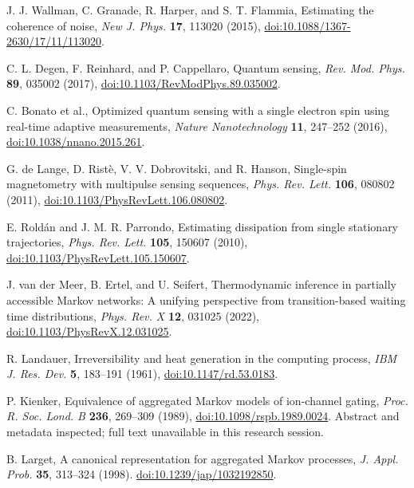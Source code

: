  J. J. Wallman, C. Granade, R. Harper, and S. T. Flammia, Estimating the coherence of noise, \emph{New J. Phys.} \textbf{17}, 113020 (2015), \href{https://doi.org/10.1088/1367-2630/17/11/113020}{doi:10.1088/1367-2630/17/11/113020}.

 C. L. Degen, F. Reinhard, and P. Cappellaro, Quantum sensing, \emph{Rev. Mod. Phys.} \textbf{89}, 035002 (2017), \href{https://doi.org/10.1103/RevModPhys.89.035002}{doi:10.1103/RevModPhys.89.035002}.

 C. Bonato et al., Optimized quantum sensing with a single electron spin using real-time adaptive measurements, \emph{Nature Nanotechnology} \textbf{11}, 247--252 (2016), \href{https://doi.org/10.1038/nnano.2015.261}{doi:10.1038/nnano.2015.261}.

 G. de Lange, D. Rist\`e, V. V. Dobrovitski, and R. Hanson, Single-spin magnetometry with multipulse sensing sequences, \emph{Phys. Rev. Lett.} \textbf{106}, 080802 (2011), \href{https://doi.org/10.1103/PhysRevLett.106.080802}{doi:10.1103/PhysRevLett.106.080802}.

 E. Rold\'an and J. M. R. Parrondo, Estimating dissipation from single stationary trajectories, \emph{Phys. Rev. Lett.} \textbf{105}, 150607 (2010), \href{https://doi.org/10.1103/PhysRevLett.105.150607}{doi:10.1103/PhysRevLett.105.150607}.

 J. van der Meer, B. Ertel, and U. Seifert, Thermodynamic inference in partially accessible Markov networks: A unifying perspective from transition-based waiting time distributions, \emph{Phys. Rev. X} \textbf{12}, 031025 (2022), \href{https://doi.org/10.1103/PhysRevX.12.031025}{doi:10.1103/PhysRevX.12.031025}.

 R. Landauer, Irreversibility and heat generation in the computing process, \emph{IBM J. Res. Dev.} \textbf{5}, 183--191 (1961), \href{https://doi.org/10.1147/rd.53.0183}{doi:10.1147/rd.53.0183}.

 P. Kienker, Equivalence of aggregated Markov models of ion-channel gating, \emph{Proc. R. Soc. Lond. B} \textbf{236}, 269--309 (1989), \href{https://doi.org/10.1098/rspb.1989.0024}{doi:10.1098/rspb.1989.0024}. Abstract and metadata inspected; full text unavailable in this research session.

 B. Larget, A canonical representation for aggregated Markov processes, \emph{J. Appl. Prob.} \textbf{35}, 313--324 (1998). \href{https://doi.org/10.1239/jap/1032192850}{doi:10.1239/jap/1032192850}.

